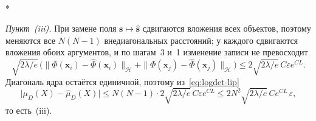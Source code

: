 \documentclass[14pt, a4paper]{extarticle}
\makeatletter
\theoremstyle{definition}
\theoremstyle{plain}
\renewenvironment{proof}[1][\proofname]{\par
    \pushQED{\qed}%
    \normalfont \topsep6\p@\@plus6\p@\relax
    \trivlist
    \item[\hskip\labelsep\itshape #1\@addpunct{.}]\mbox{}\\*
    \ignorespaces
}{\popQED\endtrivlist\@endpefalse}
\makeatother
\begin{document}
\begin{proof}[Доказательство утверждения~\ref{prop:lipschitz}]
\emph{Пункт~(iii).} При замене поля $\mathbf{s}\mapsto\widehat{\mathbf{s}}$
сдвигаются вложения всех объектов, поэтому меняются все $N(N-1)$ внедиагональных
расстояний; у каждого сдвигаются вложения обоих аргументов, и по шагам~3 и~1
изменение записи не превосходит
\[
    \sqrt{2\lambda/e}\,
      \big(\|\Phi(\mathbf{x}_i)-\widehat{\Phi}(\mathbf{x}_i)\|_{\mathcal{H}}
            +\|\Phi(\mathbf{x}_j)-\widehat{\Phi}(\mathbf{x}_j)\|_{\mathcal{H}}\big)
    \le 2\sqrt{2\lambda/e}\,C\varepsilon e^{CL} .
\]
Диагональ ядра остаётся единичной, поэтому из~\eqref{eq:logdet-lip}
\[
    \big|\mu_D(X)-\widehat{\mu}_D(X)\big|
    \le N(N-1)\cdot 2\sqrt{2\lambda/e}\,C\varepsilon e^{CL}
    \le 2N^2\sqrt{2\lambda/e}\,C e^{CL}\,\varepsilon ,
\]
то есть~(iii).
\end{proof}

\newpage
\printbibliography
\end{document}
